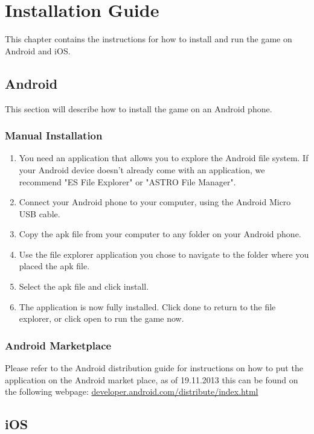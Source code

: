 \chapter{Installation Guide}

This chapter contains the instructions for how to install and run the game on 
Android and iOS.

\section{Android}

This section will describe how to install the game on an Android phone.

\subsection*{Manual Installation}
\begin{enumerate}

	\item{} You need an application that allows you to explore the Android file
	system. If your Android device doesn't already come with an application, 
	we recommend "ES File Explorer" or "ASTRO File Manager".

	\item{} Connect your Android phone to your computer, using the Android Micro
	USB cable.

	\item{} Copy the apk file from your computer to any folder on your Android 
	phone.

	\item{} Use the file explorer application you chose to navigate to the folder 
	where you placed the apk file.

	\item{} Select the apk file and click install.

	\item{} The application is now fully installed. Click done to return to the 
	file explorer, or click open to run the game now.

\end{enumerate}

\subsection*{Android Marketplace}
Please refer to the Android distribution guide for instructions on how to put 
the application on the Android market place, as of 19.11.2013 this can be found 
on the following webpage: \href{http://developer.android.com/distribute/index.html}{developer.android.com/distribute/index.html}

\section{iOS}
